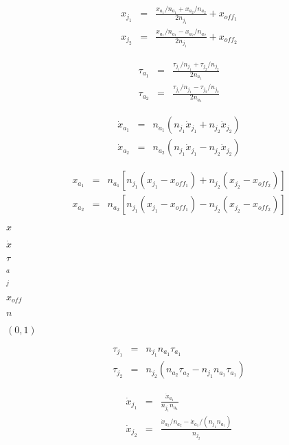 \documentclass{article}
\begin{document}
\begin{eqnarray*} x_{j_1} & = & \frac{ x_{a_1} / n_{a_1} + x_{a_2} / n_{a_2} }{2 n_{j_1}} + x_{off_1} \\[1em] x_{j_2} & = & \frac{ x_{a_1} / n_{a_1} - x_{a_2} / n_{a_2} }{2 n_{j_1}} + x_{off_2} \end{eqnarray*}
\pagebreak

\begin{eqnarray*} \tau_{a_1} & = & \frac{ \tau_{j_1} / n_{j_1} + \tau_{j_2} / n_{j_2} }{2 n_{a_1}} \\[1em] \tau_{a_2} & = & \frac{ \tau_{j_1} / n_{j_1} - \tau_{j_2} / n_{j_2} }{2 n_{a_1}} \end{eqnarray*}
\pagebreak

\begin{eqnarray*} \dot{x}_{a_1} & = & n_{a_1} ( n_{j_1} \dot{x}_{j_1} + n_{j_2} \dot{x}_{j_2} ) \\[2.5em] \dot{x}_{a_2} & = & n_{a_2} ( n_{j_1} \dot{x}_{j_1} - n_{j_2} \dot{x}_{j_2} ) \end{eqnarray*}
\pagebreak

\begin{eqnarray*} x_{a_1} & = & n_{a_1} \left[ n_{j_1} (x_{j_1} - x_{off_1}) + n_{j_2} (x_{j_2} - x_{off_2}) \right] \\[2.5em] x_{a_2} & = & n_{a_2} \left[ n_{j_1} (x_{j_1} - x_{off_1}) - n_{j_2} (x_{j_2} - x_{off_2}) \right] \end{eqnarray*}
\pagebreak

$ x $
\pagebreak

$ \dot{x} $
\pagebreak

$ \tau $
\pagebreak

$ _a $
\pagebreak

$ _j $
\pagebreak

$ x_{off}$
\pagebreak

$ n $
\pagebreak

$ (0, 1) $
\pagebreak

\begin{eqnarray*} \tau_{j_1} & = & n_{j_1} n_{a_1} \tau_{a_1} \\ \tau_{j_2} & = & n_{j_2} (n_{a_2} \tau_{a_2} - n_{j_1} n_{a_1} \tau_{a_1}) \end{eqnarray*}
\pagebreak

\begin{eqnarray*} \dot{x}_{j_1} & = & \frac{ \dot{x}_{a_1} }{ n_{j_1} n_{a_1} } \\ \dot{x}_{j_2} & = & \frac{ \dot{x}_{a_2} / n_{a_2} - \dot{x}_{a_1} / (n_{j_1} n_{a_1}) }{ n_{j_2} } \end{eqnarray*}
\pagebreak
\end{document}
